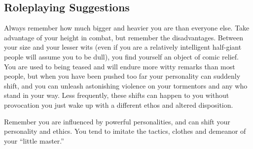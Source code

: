 \subsection{Roleplaying Suggestions}
Always remember how much bigger and heavier you are than everyone else. Take advantage of your height in combat, but remember the disadvantages. Between your size and your lesser wits (even if you are a relatively intelligent half-giant people will assume you to be dull), you find yourself an object of comic relief. You are used to being teased and will endure more witty remarks than most people, but when you have been pushed too far your personality can suddenly shift, and you can unleash astonishing violence on your tormentors and any who stand in your way. Less frequently, these shifts can happen to you without provocation you just wake up with a different ethos and altered disposition.

Remember you are influenced by powerful personalities, and can shift your personality and ethics. You tend to imitate the tactics, clothes and demeanor of your ``little master.''

